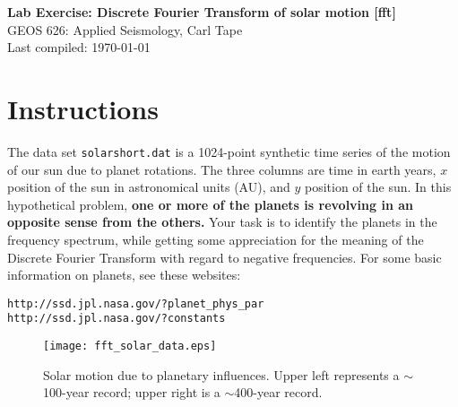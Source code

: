 \documentclass[11pt,titlepage,fleqn]{article}
\begin{document}

\begin{spacing}{1.2}
\centering
{\large \bf Lab Exercise: Discrete Fourier Transform of solar motion [fft]} \\
GEOS 626: Applied Seismology, Carl Tape \\
Last compiled: \today \\
\end{spacing}


\section*{Instructions}

The data set \verb+solarshort.dat+ is a 1024-point synthetic time series of the motion of our sun due to planet rotations. The three columns are time in earth years, $x$ position of the sun in astronomical units (AU), and $y$ position of the sun. In this hypothetical problem, {\bf one or more of the planets is revolving in an opposite sense from the others.} Your task is to identify the planets in the frequency spectrum, while getting some appreciation for the meaning of the Discrete Fourier Transform with regard to negative frequencies. For some basic information on planets, see these websites:
%
\begin{verbatim}
http://ssd.jpl.nasa.gov/?planet_phys_par
http://ssd.jpl.nasa.gov/?constants
\end{verbatim}

\begin{figure}[h]
\centering
\texttt{[image: fft\_solar\_data.eps]}
\caption[]
{{
Solar motion due to planetary influences. Upper left represents a $\sim$100-year record; upper right is a $\sim$400-year record.
\label{fig:solar}
}}
\end{figure}

\end{document}
